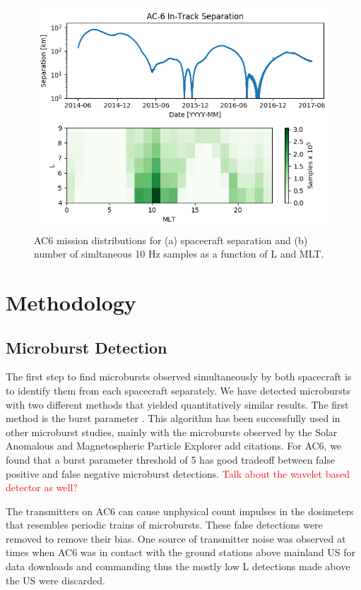 \documentclass[draft]{agujournal2019}
\begin{document}
\begin{figure}
\includegraphics[width=\textwidth]{fig1.png}
\caption{AC6 mission distributions for (a) spacecraft separation and (b) number of simltaneous 10 Hz samples as a function of L and MLT.} \label{fig1}
\end{figure}

\section{Methodology}
\subsection{Microburst Detection}
The first step to find microbursts observed simultaneously by both spacecraft is to identify them from each spacecraft separately. We have detected microbursts with two different methods that yielded quantitatively similar results. The first method is the burst parameter \cite{O'Brien2003}. This algorithm has been successfully used in other microburst studies, mainly with the microbursts observed by the Solar Anomalous and Magnetospheric Particle Explorer add citations. For AC6, we found that a burst parameter threshold of 5 has good tradeoff between false positive and false negative microburst detections. \textcolor{red}{Talk about the wavelet based detector as well?}

The transmitters on AC6 can cause unphysical count impulses in the dosimeters that resembles periodic trains of microbursts. These false detections were removed to remove their bias. One source of transmitter noise was observed at times when AC6 was in contact with the ground stations above mainland US for data downloads and commanding thus the mostly low L detections made above the US were discarded. 
\end{document}
